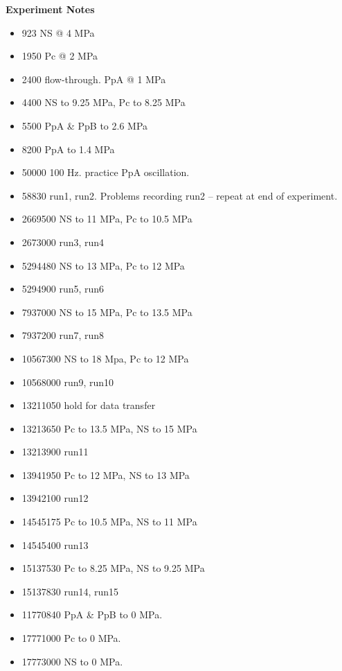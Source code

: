 \documentclass[letterpaper, 10pt]{article}
\begin{document}
\newpage 
 \textbf{Experiment Notes}
 \medskip
 {\small \begin{itemize}[label=\#]
 \setlength\itemsep{0.25em}
 	 \item 923 NS @ 4 MPa
 	 \item 1950 Pc @ 2 MPa
 	 \item 2400 flow-through. PpA @ 1 MPa
 	 \item 4400 NS to 9.25 MPa, Pc to 8.25 MPa
 	 \item 5500 PpA \& PpB to 2.6 MPa
 	 \item 8200 PpA to 1.4 MPa
 	 \item 50000 100 Hz. practice PpA oscillation. 
 	 \item 58830 run1, run2. Problems recording run2 -- repeat at end of experiment.
 	 \item 2669500 NS to 11 MPa, Pc to 10.5 MPa
 	 \item 2673000 run3, run4
 	 \item 5294480 NS to 13 MPa, Pc to 12 MPa
 	 \item 5294900 run5, run6
 	 \item 7937000 NS to 15 MPa, Pc to 13.5 MPa
 	 \item 7937200 run7, run8
 	 \item 10567300 NS to 18 Mpa, Pc to 12 MPa
 	 \item 10568000 run9, run10
 	 \item 13211050 hold for data transfer
 	 \item 13213650 Pc to 13.5 MPa, NS to 15 MPa
 	 \item 13213900 run11
 	 \item 13941950 Pc to 12 MPa, NS to 13 MPa
 	 \item 13942100 run12
 	 \item 14545175 Pc to 10.5 MPa, NS to 11 MPa
 	 \item 14545400 run13
 	 \item 15137530 Pc to 8.25 MPa, NS to 9.25 MPa
 	 \item 15137830 run14, run15
 	 \item 11770840 PpA \& PpB to 0 MPa. 
 	 \item 17771000 Pc to 0 MPa. 
 	 \item 17773000 NS to 0 MPa.
 \end{itemize}} 

 
\end{document}
